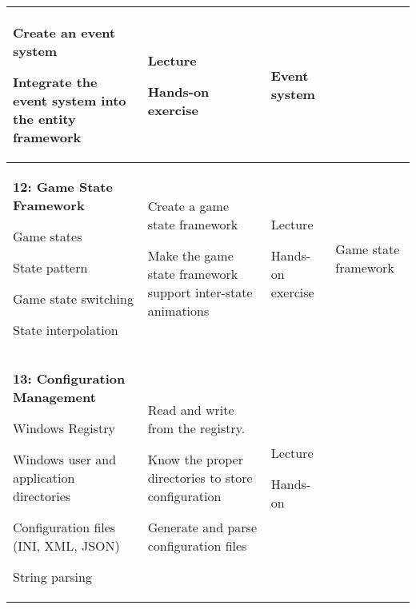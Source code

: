 \documentclass[10pt]{article}
\newenvironment{itemize*}{
\begin{itemize}[leftmargin=1em,noitemsep,nolistsep]
}{\end{itemize}}
\begin{document}
\begin{longtable}{||p{1.8in}|p{2.4in}|p{1.3in}|p{1in}||}
	\begin{itemize*}
		\item Create an event system
		\item Integrate the event system into the entity framework
	\end{itemize*} &
	\begin{itemize*}
		\item Lecture
		\item Hands-on exercise
	\end{itemize*} & Event system\\ \hline
\textbf{12: Game State Framework}
	\begin{itemize*}
		\item Game states
		\item State pattern
		\item Game state switching
		\item State interpolation
	\end{itemize*}&
	\begin{itemize*}
		\item Create a game state framework
		\item Make the game state framework support inter-state animations
	\end{itemize*} &
	\begin{itemize*}
		\item Lecture
		\item Hands-on exercise
	\end{itemize*} & Game state framework \\ \hline
\textbf{13: Configuration Management}
	\begin{itemize*}
		\item Windows Registry
		\item Windows user and application directories
		\item Configuration files (INI, XML, JSON)
		\item String parsing
	\end{itemize*} &
	\begin{itemize*}
		\item Read and write from the registry.
		\item Know the proper directories to store configuration
		\item Generate and parse configuration files
	\end{itemize*} &
	\begin{itemize*}
		\item Lecture
		\item Hands-on

\end{itemize*}
\end{longtable}
\end{document}
